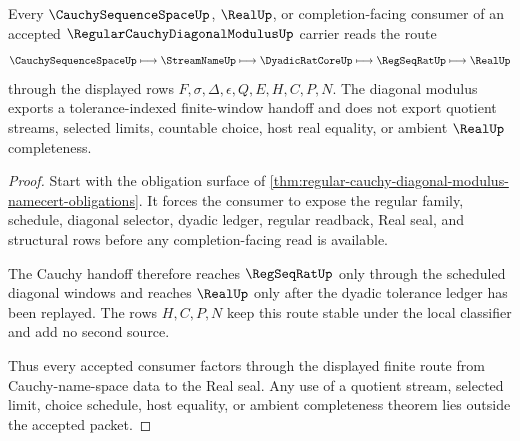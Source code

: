 \begin{theorem}
\label{thm:regular-cauchy-diagonal-modulus-cauchy-handoff}
Every $\CauchySequenceSpaceUp$, $\RealUp$, or completion-facing consumer of an accepted $\RegularCauchyDiagonalModulusUp$ carrier reads the route
$$
\CauchySequenceSpaceUp \longmapsto \StreamNameUp \longmapsto \DyadicRatCoreUp \longmapsto \RegSeqRatUp \longmapsto \RealUp
$$
through the displayed rows $F,\sigma,\Delta,\epsilon,Q,E,H,C,P,N$. The diagonal modulus exports a tolerance-indexed finite-window handoff and does not export quotient streams, selected limits, countable choice, host real equality, or ambient $\RealUp$ completeness.
\end{theorem}
\begin{proof}
Start with the obligation surface of \autoref{thm:regular-cauchy-diagonal-modulus-namecert-obligations}. It forces the consumer to expose the regular family, schedule, diagonal selector, dyadic ledger, regular readback, Real seal, and structural rows before any completion-facing read is available.

The Cauchy handoff therefore reaches $\RegSeqRatUp$ only through the scheduled diagonal windows and reaches $\RealUp$ only after the dyadic tolerance ledger has been replayed. The rows $H,C,P,N$ keep this route stable under the local classifier and add no second source.

Thus every accepted consumer factors through the displayed finite route from Cauchy-name-space data to the Real seal. Any use of a quotient stream, selected limit, choice schedule, host equality, or ambient completeness theorem lies outside the accepted packet.
\end{proof}




